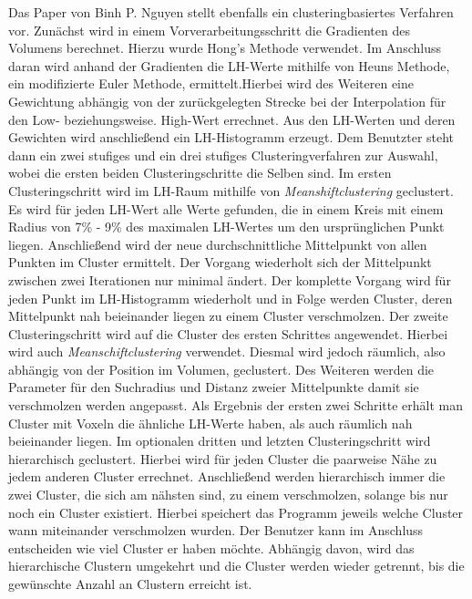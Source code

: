 Das Paper von Binh P. Nguyen \cite{nguyen2012clustering} stellt ebenfalls ein clusteringbasiertes Verfahren vor.
\newline
Zunächst wird in einem Vorverarbeitungsschritt die Gradienten des Volumens berechnet. Hierzu wurde Hong's Methode \cite{hong2003method} verwendet. Im Anschluss daran wird anhand der Gradienten die LH-Werte mithilfe von Heuns Methode, ein modifizierte Euler Methode, ermittelt.Hierbei wird des Weiteren eine Gewichtung abhängig von der zurückgelegten Strecke bei der Interpolation für den Low- beziehungsweise. High-Wert errechnet. Aus den LH-Werten und deren Gewichten wird anschließend ein LH-Histogramm erzeugt.
\newline
Dem Benutzter steht dann ein zwei stufiges und ein drei stufiges Clusteringverfahren zur Auswahl, wobei die ersten beiden Clusteringschritte die Selben sind. 
Im ersten Clusteringschritt wird im LH-Raum mithilfe von \textit{Meanshiftclustering} geclustert. Es wird für jeden LH-Wert alle Werte gefunden, die in einem Kreis mit einem Radius von 7\% - 9\%  des maximalen LH-Wertes um den ursprünglichen Punkt liegen. Anschließend wird der neue durchschnittliche Mittelpunkt von allen Punkten im Cluster ermittelt. Der Vorgang wiederholt sich der Mittelpunkt zwischen zwei Iterationen nur minimal ändert. Der komplette Vorgang wird für jeden Punkt im LH-Histogramm wiederholt und in Folge werden Cluster, deren Mittelpunkt nah beieinander liegen zu einem Cluster verschmolzen.
\newline
Der zweite Clusteringschritt wird auf die Cluster des ersten Schrittes angewendet. Hierbei wird auch \textit{Meanschiftclustering} verwendet. Diesmal wird jedoch räumlich, also abhängig von der Position im Volumen, geclustert. Des Weiteren werden die Parameter für den Suchradius und Distanz zweier Mittelpunkte damit sie verschmolzen werden angepasst.
\newline
Als Ergebnis der ersten zwei Schritte erhält man Cluster mit Voxeln die ähnliche LH-Werte haben, als auch räumlich nah beieinander liegen.
\newline
Im optionalen dritten und letzten Clusteringschritt wird hierarchisch geclustert. Hierbei wird für jeden Cluster die paarweise Nähe zu jedem anderen Cluster errechnet. Anschließend werden hierarchisch immer die zwei Cluster, die sich am nähsten sind, zu einem verschmolzen, solange bis nur noch ein Cluster existiert.  Hierbei speichert das Programm jeweils welche Cluster wann miteinander verschmolzen wurden. Der Benutzer kann im Anschluss entscheiden wie viel Cluster er haben möchte. Abhängig davon, wird das hierarchische Clustern umgekehrt und die Cluster werden wieder getrennt, bis die gewünschte Anzahl an Clustern erreicht ist.
